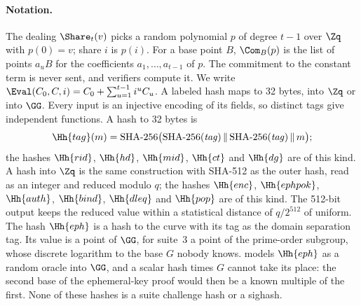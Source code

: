 \paragraph{Notation.} The dealing $\Share_t(v)$ picks a random polynomial $p$ of degree $t-1$ over $\Zq$ with $p(0) = v$; share $i$ is $p(i)$. For a base point $B$, $\Com_B(p)$ is the list of points $a_u B$ for the coefficients $a_1,\dots,a_{t-1}$ of $p$. The commitment to the constant term is never sent, and verifiers compute it. We write $\Eval(C_0, C, i) = C_0 + \sum_{u=1}^{t-1} i^u C_u$. A labeled hash maps to 32 bytes, into $\Zq$ or into $\GG$. Every input is an injective encoding of its fields, so distinct tags give independent functions. A hash to 32 bytes is
\[
  \Hh{tag}(m) = \text{SHA-256}\bigl(\text{SHA-256}(\mathit{tag}) \,\|\, \text{SHA-256}(\mathit{tag}) \,\|\, m\bigr);
\]
the hashes $\Hh{rid}$, $\Hh{hd}$, $\Hh{mid}$, $\Hh{ct}$ and $\Hh{dg}$ are of this kind. A hash into $\Zq$ is the same construction with SHA-512 as the outer hash, read as an integer and reduced modulo $q$; the hashes $\Hh{enc}$, $\Hh{ephpok}$, $\Hh{auth}$, $\Hh{bind}$, $\Hh{dleq}$ and $\Hh{pop}$ are of this kind. The 512-bit output keeps the reduced value within a statistical distance of $q/2^{512}$ of uniform. The hash $\Hh{eph}$ is a hash to the curve with its tag as the domain separation tag. Its value is a point of $\GG$, for suite~3 a point of the prime-order subgroup, whose discrete logarithm to the base $G$ nobody knows.  models $\Hh{eph}$ as a random oracle into $\GG$, and a scalar hash times $G$ cannot take its place: the second base of the ephemeral-key proof would then be a known multiple of the first. None of these hashes is a suite challenge hash or a sighash.

